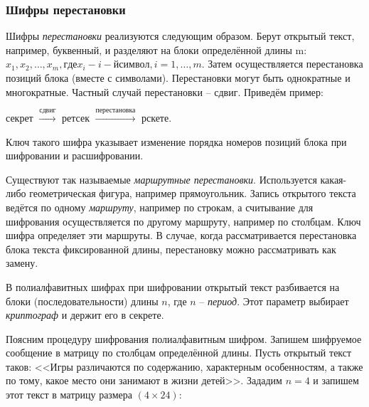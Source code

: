 \subsubsection{Шифры перестановки}

Шифры \emph{перестановки} реализуются следующим образом. Берут открытый текст, например, буквенный, и разделяют на блоки определённой длины m: $x_1, x_2, \dots, x_m, где x_i - i-й символ, i = 1, \dots , m$. Затем осуществляется перестановка позиций блока (вместе с символами). Перестановки могут быть однократные и многократные. Частный случай перестановки -- сдвиг. Приведём пример:
\begin{center}
    секрет $\xrightarrow{\text{сдвиг}}$ ретсек $\xrightarrow{\text{перестановка}}$ рскете.
\end{center}
Ключ такого шифра указывает изменение порядка номеров позиций блока при шифровании и расшифровании.

Существуют так называемые \emph{маршрутные перестановки}. Используется какая-либо геометрическая фигура, например прямоугольник. Запись открытого текста ведётся по одному \emph{маршруту}, например по строкам, а считывание для шифрования осуществляется по другому маршруту, например по столбцам. Ключ шифра определяет эти маршруты.
В случае, когда рассматривается перестановка блока текста фиксированной длины, перестановку можно рассматривать как замену.

В полиалфавитных шифрах при шифровании открытый текст разбивается на блоки (последовательности) длины $n$, где $n$ -- \emph{период}. Этот параметр выбирает \emph{криптограф} и держит его в секрете.

Поясним процедуру шифрования полиалфавитным шифром. Запишем шифруемое сообщение в матрицу по столбцам определённой длины. Пусть открытый текст таков: <<Игры различаются по содержанию, характерным особенностям, а также по тому, какое место они занимают в жизни детей>>. Зададим $n=4$ и запишем этот текст в матрицу размера $(4 \times 24)$:

\begin{center}  \end{center}

